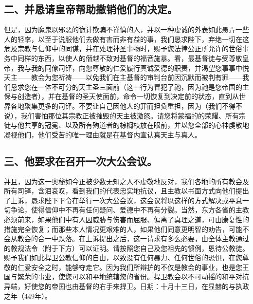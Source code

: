 
\subsection{二、并恳请皇帝帮助撤销他们的决定。}

但是，因为魔鬼以邪恶的诡计欺骗不谨慎的人，并以一种虔诚的外表如此愚弄一些人的轻率，以至于说服他们去做有害而非有益的事，我们恳求陛下，弃绝一切在这危及宗教与信仰中的同谋，并在处理神圣事物时，赐予您法律公正所允许的世俗事务中同样的东西，以使人的僭越不致对基督的福音施暴。看，最基督徒与受尊敬皇帝，我与我的同僚司铎，向您尊敬的仁爱履行真诚爱德的职责，并渴望您事事中悦天主——教会为您祈祷——以免我们在主基督的审判台前因沉默而被判有罪——我们恳求您在一体不可分的天主圣三面前（这一行为冒犯了祂，因为祂是您帝国的主保与创造者），并在基督的圣天使面前，命令一切恢复到决定前的状态，直到从世界各地聚集更多的司铎。不要让自己因他人的罪而担负重担，因为（我们不得不说），我们害怕那位其宗教正被摧毁的天主被激怒。请您将蒙福的的荣耀、所有宗徒与他共享的冠冕、以及所有殉道者的棕榈枝放在眼前，并以您全部的心神虔敬地凝视他们，他们受苦的唯一理由就是在基督内宣认真天主与真人。\par


\subsection{三、他要求在召开一次大公会议。}

并且，因为这一奥秘如今正被少数无知之人不虔敬地反对，我们各地的所有教会及所有司铎，含泪哀叹，看到我们的代表忠实地抗议，且主教以书面方式向他们提出了上诉，恳求陛下下令在举行一次大公会议，这会议将以这样的方式解决或平息一切争论，使得信仰中不再有任何疑问、爱德中不再有分裂。当然，东方各省的主教必须前来，如果他们中有人因威胁与伤害而屈服、偏离了真理之道，可由康复性的措施完全恢复；而那些本人情况更艰难的人，如果他们同意更明智的劝告，可能不会从教会的合一中跌落。在上诉提出之后，这一请求有多么必要，由全体主教通过的教规法令（附于下方）可以证明。请按照您自己及您祖先的惯例，恩待公教徒。赐予我们如此捍卫公教信仰的自由，以致没有任何暴力、任何世俗的恐惧，在您尊敬的仁爱安全之时，能够夺走它。因为我们所辩护的不仅是教会的事业，也是您王国与繁荣的事业，使您可以和平地统辖您的省份。捍卫教会以不可动摇的和平对抗异端，好使您的帝国也由基督的右手来捍卫。日期：十月十三日，在显赫的与执政之年（449年）。\par

